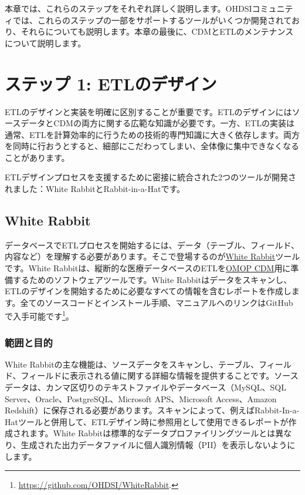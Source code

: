 \documentclass[
  11pt]{book}
\theoremstyle{definition}
\theoremstyle{definition}
\theoremstyle{definition}
\theoremstyle{definition}
\theoremstyle{remark}
\begin{document}
本章では、これらのステップをそれぞれ詳しく説明します。OHDSIコミュニティでは、これらのステップの一部をサポートするツールがいくつか開発されており、それらについても説明します。本章の最後に、CDMとETLのメンテナンスについて説明します。

\section{ステップ 1: ETLのデザイン}\label{ux30b9ux30c6ux30c3ux30d7-1-etlux306eux30c7ux30b6ux30a4ux30f3}

ETLのデザインと実装を明確に区別することが重要です。ETLのデザインにはソースデータとCDMの両方に関する広範な知識が必要です。一方、ETLの実装は通常、ETLを計算効率的に行うための技術的専門知識に大きく依存します。両方を同時に行おうとすると、細部にこだわってしまい、全体像に集中できなくなることがあります。

ETLデザインプロセスを支援するために密接に統合された2つのツールが開発されました：White RabbitとRabbit-in-a-Hatです。

\subsection{White Rabbit}\label{white-rabbit}

データベースでETLプロセスを開始するには、データ（テーブル、フィールド、内容など）を理解する必要があります。そこで登場するのが\href{https://github.com/OHDSI/WhiteRabbit}{White Rabbit}ツールです。White Rabbitは、縦断的な医療データベースのETLを\href{https://github.com/OHDSI/CommonDataModel}{OMOP CDM}用に準備するためのソフトウェアツールです。White Rabbitはデータをスキャンし、ETLのデザインを開始するために必要なすべての情報を含むレポートを作成します。全てのソースコードとインストール手順、マニュアルへのリンクはGitHubで入手可能です\footnote{\url{https://github.com/OHDSI/WhiteRabbit}.}。 

\subsubsection*{範囲と目的}\label{ux7bc4ux56f2ux3068ux76eeux7684}

White Rabbitの主な機能は、ソースデータをスキャンし、テーブル、フィールド、フィールドに表示される値に関する詳細な情報を提供することです。ソースデータは、カンマ区切りのテキストファイルやデータベース（MySQL、SQL Server、Oracle、PostgreSQL、Microsoft APS、Microsoft Access、Amazon Redshift）に保存される必要があります。スキャンによって、例えばRabbit-In-a-Hatツールと併用して、ETLデザイン時に参照用として使用できるレポートが作成されます。White Rabbitは標準的なデータプロファイリングツールとは異なり、生成された出力データファイルに個人識別情報（PII）を表示しないようにします。
\end{document}

